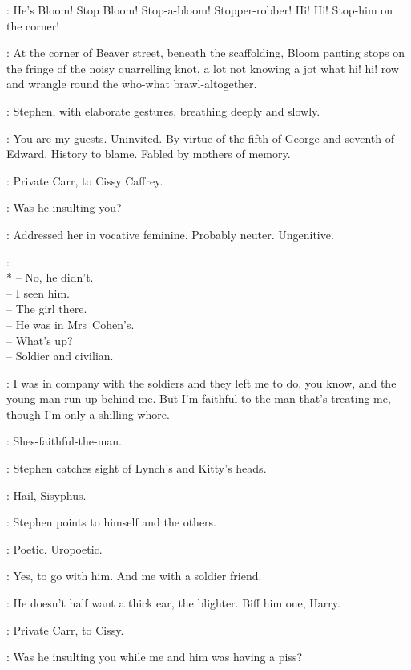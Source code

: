 \HueCry:
He's Bloom!
Stop Bloom!
Stop-a-bloom!
Stopper-robber!
Hi! Hi!
Stop-him on the corner!


:
At the corner of Beaver street, beneath the scaffolding,
Bloom panting stops on the fringe of the noisy quarrelling knot,
a lot not knowing a jot
what hi! hi!
row and wrangle round the who-what brawl-altogether.

:
Stephen, with elaborate gestures, breathing deeply and slowly.

\Stephen:
You are my guests.
Uninvited.
By virtue of the fifth of George and seventh of Edward.
History to blame.
Fabled by mothers of memory.

:
Private Carr, to Cissy Caffrey.

\Carr:
Was he insulting you?

\Stephen:
Addressed her in vocative feminine.
Probably neuter.
Ungenitive.

\Voices:\\*
-- No, he didn't.\\
-- I seen him.\\
-- The girl there.\\
-- He was in Mrs~Cohen's.\\
-- What's up?\\
-- Soldier and civilian.

\Cissy[2]:
I was in company with the soldiers and they left me
to do, you know, and the young man run up behind me.
But I'm faithful to the man that's treating me,
though I'm only a shilling whore.

\Voices:
Shes-faithful-the-man.

:
Stephen catches sight of Lynch's and Kitty's heads.

\Stephen:
Hail, Sisyphus.

:
Stephen points to himself and the others.

\Stephen:
Poetic.
Uropoetic.

\Cissy:
Yes, to go with him.
And me with a soldier friend.

\Compton[2]:
He doesn't half want a thick ear, the blighter.
Biff him one, Harry.

:
Private Carr, to Cissy.

\Carr:
Was he insulting you while me and him was having a piss?

